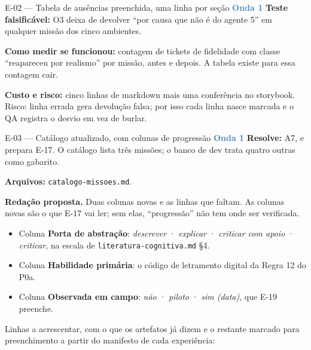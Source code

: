 \documentclass[11pt,a4paper]{article}
\newcommand{\onda}[1]{\textcolor{SteelBlue}{\textbf{Onda #1}}}
\begin{document}
\begin{emendabox}{E-02 --- Tabela de ausências preenchida, uma linha por seção \hfill \onda{1}}
\textbf{Teste falsificável:} O3 deixa de devolver ``por causa que não é do agente 5'' em
qualquer missão dos cinco ambientes.

\textbf{Como medir se funcionou:} contagem de tickets de fidelidade com classe ``reapareceu por
realismo'' por missão, antes e depois. A tabela existe para essa contagem cair.

\textbf{Custo e risco:} cinco linhas de markdown mais uma conferência no storybook. Risco: linha
errada gera devolução falsa; por isso cada linha nasce marcada e o QA registra o desvio em vez de
burlar.
\end{emendabox}

\begin{emendabox}{E-03 --- Catálogo atualizado, com colunas de progressão \hfill \onda{1}}
\textbf{Resolve:} A7, e prepara E-17. O catálogo lista três missões; o banco de dev trata quatro
outras como gabarito.

\textbf{Arquivos:} \texttt{catalogo-missoes.md}.

\textbf{Redação proposta.} Duas colunas novas e as linhas que faltam. As colunas novas são o que
E-17 vai ler; sem elas, ``progressão'' não tem onde ser verificada.

\begin{itemize}
  \item Coluna \textbf{Porta de abstração}: \emph{descrever} · \emph{explicar} · \emph{criticar com
        apoio} · \emph{criticar}, na escala de \texttt{literatura-cognitiva.md} \S4.
  \item Coluna \textbf{Habilidade primária}: o código de letramento digital da Regra 12 do P0a.
  \item Coluna \textbf{Observada em campo}: \emph{não} · \emph{piloto} · \emph{sim (data)}, que E-19
        preenche.
\end{itemize}

Linhas a acrescentar, com o que os artefatos já dizem e o restante marcado para preenchimento a
partir do manifesto de cada experiência:


\end{emendabox}
\end{document}
